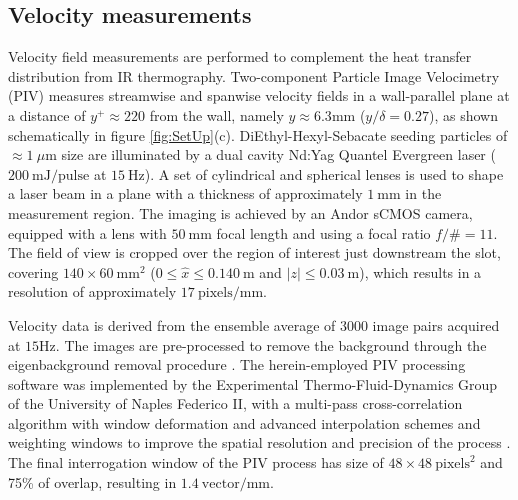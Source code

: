 
\subsection{Velocity measurements \label{ss:PIV}}
Velocity field measurements are performed to complement the heat transfer distribution from IR thermography. Two-component Particle Image Velocimetry (PIV) measures streamwise and spanwise velocity fields in a wall-parallel plane at a distance of $y^+ \approx 220$ from the wall, namely $y\approx 6.3\mathrm{mm}$ ($y/\delta = 0.27$), as shown schematically in figure \ref{fig:SetUp}(c). DiEthyl-Hexyl-Sebacate seeding particles of $\approx 1~\mu\mathrm{m}$ size are illuminated by a dual cavity Nd:Yag Quantel Evergreen laser ($200~\mathrm{mJ/pulse}$ at $15~\mathrm{Hz}$). A set of cylindrical and spherical lenses is used to shape a laser beam in a plane with a thickness of approximately $1~\mathrm{mm}$ in the measurement region. The imaging is achieved by an Andor sCMOS camera, equipped with a lens with $50~\mathrm{mm}$ focal length and using a focal ratio $f/\# = 11$. The field of view is cropped over the region of interest just downstream the slot, covering $140\times60~\mathrm{mm}^2$ ($0 \leq \hat{x} \leq 0.140~\mathrm{m}$ and $|z|\leq 0.03~\mathrm{m}$), which results in a resolution of approximately $17~\mathrm{pixels/mm}$. 

Velocity data is derived from the ensemble average of $3000$ image pairs acquired at $15\mathrm{Hz}$. The images are pre-processed to remove the background through the eigenbackground removal procedure \citep{Mendez2017pod-piv}. The herein-employed PIV processing software was implemented by the Experimental Thermo-Fluid-Dynamics Group of the University of Naples Federico II, with a multi-pass cross-correlation algorithm with window deformation \citep{soria1996piv,scarano2001iterativeimgdef} and advanced interpolation schemes and weighting windows to improve the spatial resolution and precision of the process \citep{Astarita2006PIV,Astarita2007PIV}. The final interrogation window of the PIV process has size of $48\times48~\mathrm{pixels}^2$ and 75\% of overlap, resulting in $1.4~\mathrm{vector/mm}$.


